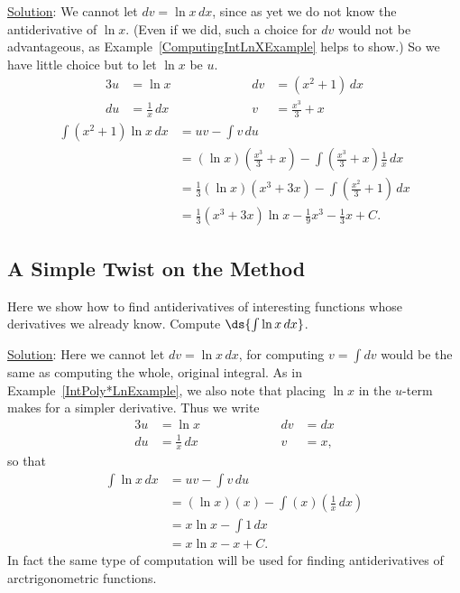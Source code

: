 \underline{Solution}: We cannot let $dv=\ln x\,dx$, since
as yet we do not know the antiderivative of $\ln x$.
(Even if we did, such a choice for $dv$ would not be advantageous,
as Example~\ref{ComputingIntLnXExample} helps to show.)
So we have little choice but to let $\ln x$ be $u$.
\begin{alignat*}{3}
u&=\ln x&&\qquad\qquad&dv&=(x^2+1)\,dx\\
du&=\frac1x\,dx&&&v&=\frac{x^3}3+x\end{alignat*}
\begin{align*}
\int(x^2+1)\ln x\,dx&=uv-\int v\,du\\
                    &=(\ln x)\left(\frac{x^3}3+x\right)
                     -\int\left(\frac{x^3}3+x\right)\frac1x\,dx\\
               &=\frac13(\ln x)(x^3+3x)-\int\left(\frac{x^2}3+1\right)\,dx\\
            &=\frac13(x^3+3x)\ln x-\frac19x^3-\frac13x+C.
                   \end{align*}
\label{IntPoly*LnExample}\eex





\subsection{A Simple Twist on the Method}
Here we show how to find antiderivatives of interesting functions
whose derivatives we already know.  
\bex Compute $\ds{\int \ln x\,dx}$.

\underline{Solution}: Here we cannot let $dv=\ln x\,dx$, for
computing $v=\int dv$ would be the same as computing the whole,
original integral.  As in Example~\ref{IntPoly*LnExample},
we also note that placing $\ln x$ in the $u$-term makes for
a simpler derivative.  Thus we write
\begin{alignat*}{3}
u&=\ln x&&\qquad\qquad&dv&=dx\\
du&=\frac1x\,dx&&&v&=x,\end{alignat*}
so that
\begin{align*}
\int \ln x\,dx&=uv-\int v\,du\\
              &=(\ln x)(x)-\int(x)\left(\frac1x\,dx\right)\\
              &=x\ln x-\int 1\,dx\\
              &=x\ln x-x+C.\end{align*}
\label{ComputingIntLnXExample}\eex
In fact the same type of computation will be used for 
finding antiderivatives of arctrigonometric functions.

